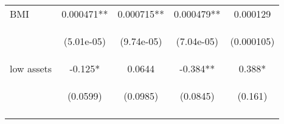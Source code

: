 \documentclass[]{article}
\begin{document}
\begin{center}
\begin{tabular}{lcccc}
BMI & 0.000471** & 0.000715** & 0.000479** & 0.000129 \\
\vspace{4pt} & \begin{footnotesize}(5.01e-05)\end{footnotesize} & \begin{footnotesize}(9.74e-05)\end{footnotesize} & \begin{footnotesize}(7.04e-05)\end{footnotesize} & \begin{footnotesize}(0.000105)\end{footnotesize} \\
low assets & -0.125* & 0.0644 & -0.384** & 0.388* \\
\vspace{4pt} & \begin{footnotesize}(0.0599)\end{footnotesize} & \begin{footnotesize}(0.0985)\end{footnotesize} & \begin{footnotesize}(0.0845)\end{footnotesize} & \begin{footnotesize}(0.161)\end{footnotesize} \\
\vspace{4pt} & \begin{footnotesize}\end{footnotesize} & \begin{footnotesize}\end{footnotesize} & \begin{footnotesize}\end{footnotesize} & \begin{footnotesize}\end{footnotesize} \\

\end{tabular}
\end{center}
\end{document}
